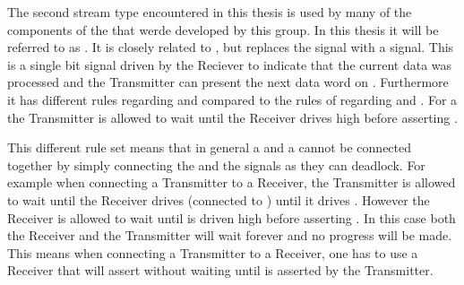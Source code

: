 The second stream type encountered in this thesis is used by many of the components of the \FPGA{} that werde developed by this group. In this thesis it will be referred to as \ValidNextStream{}. It is closely related to \AXIStream{}, but replaces the \TREADY{} signal with a \NEXT{} signal.
This is a single bit signal driven by the Reciever to indicate that the current data was processed and the Transmitter can present the next data word on \TDATA{}. Furthermore it has different rules regarding \TVALID{} and \NEXT{} compared to the rules of regarding \TVALID{} and \TREADY{}.
For a \ValidNextStream{} the Transmitter is allowed to wait until the Receiver drives \NEXT{} high before asserting \TVALID{}.

This different rule set means that in general a \AXIStream{} and a \ValidNextStream{} cannot be connected together by simply connecting the \TREADY{} and the \NEXT{} signals as they can deadlock. For example when connecting a \ValidNextStream{} Transmitter to a \AXIStream{} Receiver, the \ValidNextStream{} Transmitter is allowed to wait until the \AXIStream{} Receiver drives \TREADY{} (connected to \NEXT{}) until it drives \TVALID{}. However the \AXIStream{} Receiver is allowed to wait until \TVALID{} is driven high before asserting \TREADY{}. In this case both the Receiver and the Transmitter will wait forever and no progress will be made. This means when connecting a \ValidNextStream{} Transmitter to a \AXIStream{} Receiver, one has to use a \AXIStream{} Receiver that will assert \TREADY{} without waiting until \TVALID{} is asserted by the Transmitter.

